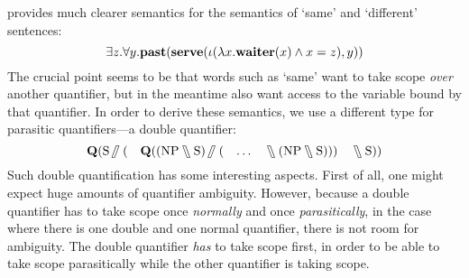 \citet{kiselyov2015b} provides much clearer semantics for the semantics
of `same' and `different' sentences:
\[
  \exists{z}.\forall{y}.\PAST(\SERVE(\iota(\lambda{x}.\WAITER(x)\wedge{x=z}),y))
\]
The crucial point seems to be that words such as `same' want to take
scope \emph{over} another quantifier, but in the meantime also want
access to the variable bound by that quantifier. In order to derive
these semantics, we use a different type for parasitic quantifiers---a
double quantifier:
\[
  \q[\S\himpl(\quad{\q[(\NP\himpr\S)\himpl(\quad{\ldots}\quad\himpr(\NP\himpr\S))]}\quad\himpr\S)]
\]
Such double quantification has some interesting aspects. First of all,
one might expect huge amounts of quantifier ambiguity. However,
because a double quantifier has to take scope once \emph{normally} and
once \emph{parasitically}, in the case where there is one double and
one normal quantifier, there is not room for ambiguity. The double
quantifier \emph{has} to take scope first, in order to be able to take
scope parasitically while the other quantifier is taking scope.

